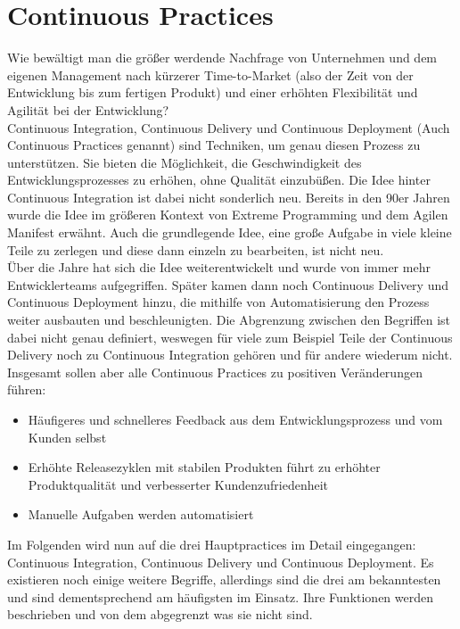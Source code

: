 \section{Continuous Practices}\label{CP}
Wie bewältigt man die größer werdende Nachfrage von Unternehmen und dem eigenen Management nach kürzerer Time-to-Market (also der Zeit von der Entwicklung bis zum fertigen Produkt) und einer erhöhten Flexibilität und Agilität bei der Entwicklung?\autocite[Vgl.][]{Capgemini.2017}\\ Continuous Integration, Continuous Delivery und Continuous Deployment (Auch Continuous Practices genannt) sind Techniken, um genau diesen Prozess zu unterstützen.  Sie bieten die Möglichkeit, die Geschwindigkeit des Entwicklungsprozesses zu erhöhen, ohne Qualität einzubüßen.\autocite[Vgl.][S.2]{Shahin.2017}
Die Idee hinter Continuous Integration ist dabei nicht sonderlich neu. Bereits in den 90er Jahren wurde die Idee im größeren Kontext von Extreme Programming und dem Agilen Manifest erwähnt.\autocite[Vgl.][S.2]{Stahl.2018} Auch die grundlegende Idee, eine große Aufgabe in viele kleine Teile zu zerlegen und diese dann einzeln zu bearbeiten, ist nicht neu.\\ Über die Jahre hat sich die Idee weiterentwickelt und wurde von immer mehr Entwicklerteams aufgegriffen. Später kamen dann noch Continuous Delivery und Continuous Deployment hinzu, die mithilfe von Automatisierung den Prozess weiter ausbauten und beschleunigten. Die Abgrenzung zwischen den Begriffen ist dabei nicht genau definiert, weswegen für viele zum Beispiel Teile der Continuous Delivery noch zu Continuous Integration gehören und für andere wiederum nicht. Insgesamt sollen aber alle Continuous Practices zu positiven Veränderungen führen:\autocite[Vgl.][S.2]{Shahin.2017}
\begin{itemize}
	\item Häufigeres und schnelleres Feedback aus dem Entwicklungsprozess und vom Kunden selbst 
	\item Erhöhte Releasezyklen mit stabilen Produkten führt zu erhöhter Produktqualität und verbesserter Kundenzufriedenheit
	\item Manuelle Aufgaben werden automatisiert
\end{itemize}
Im Folgenden wird nun auf die drei Hauptpractices im Detail eingegangen: Continuous Integration, Continuous Delivery und Continuous Deployment. Es existieren noch einige weitere Begriffe, allerdings sind die drei am bekanntesten und sind dementsprechend am häufigsten im Einsatz. Ihre Funktionen werden beschrieben und von dem abgegrenzt was sie nicht sind. 
